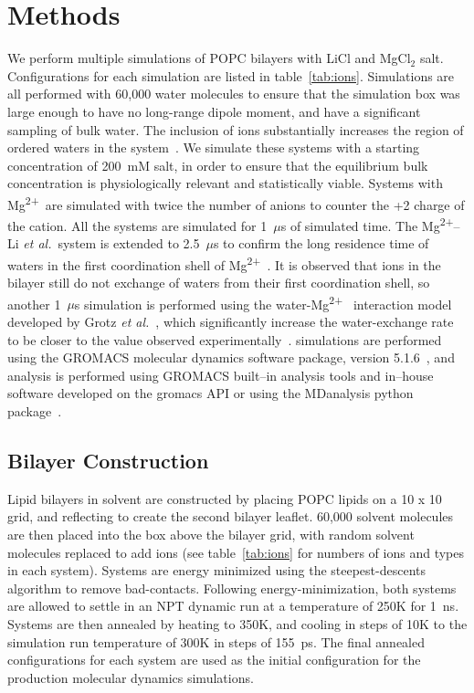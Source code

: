 \documentclass[journal=langd5,manuscript=article]{achemso}
\newcommand{\etal}{\textit{et al.}~}
\newcommand{\mg}{Mg\textsuperscript{2+}~}
\newcommand{\mgmbnbfix}{Mg\textsuperscript{2+}--Li \etal} %
\begin{document}
\section{Methods}
We perform multiple simulations of POPC bilayers
with LiCl and MgCl$_{2}$ salt. Configurations for each simulation are listed in table~\ref{tab:ions}.
Simulations are all performed with 
60,000 water molecules to ensure that the simulation box
was large enough to have no long-range dipole moment, 
and have a significant 
sampling of bulk water. The inclusion of ions substantially increases the region of ordered 
waters in the system~\cite{kruczek:2019,saunders:2022}.
We simulate these systems with a starting concentration of 200~mM salt, in order to ensure
that the equilibrium bulk concentration is physiologically relevant and 
 statistically viable.
Systems with \mg are simulated with twice the number of 
anions to counter the +2 charge of the cation. All the systems are simulated for 1~$\mu$s of simulated time. 
The \mgmbnbfix system is extended to 2.5~$\mu$s to confirm the 
long residence time of waters in the first coordination shell of \mg\cite{grotz:2021:optimized}. 
It is observed that ions in the bilayer still do not
exchange of waters from their first coordination shell, 
so another 1~$\mu$s simulation is performed using the water-\mg 
interaction model developed by Grotz \etal, which significantly increase the water-exchange rate to be closer 
to the value observed experimentally~\cite{grotz:2021:optimized}.
 simulations are performed using the GROMACS molecular dynamics software package, 
version 5.1.6~\cite{abraham:2015,pall:2014,van:2005,lindahl:2001,berendsen:1995}, and analysis is performed using 
GROMACS built--in analysis tools and in--house software developed
on the gromacs API or using the MDanalysis python package~\cite{gromacsmanual,mdanalysis1,mdanalysis2}.
\subsection{Bilayer Construction}
Lipid bilayers in solvent are constructed by placing POPC lipids on a 10 x 10 grid,
and reflecting to create the second bilayer leaflet. 60,000 solvent molecules are then placed 
into the box above the bilayer grid, with random solvent molecules replaced to 
add ions (see table~\ref{tab:ions} for numbers of ions and types in each system).
Systems are energy minimized using the steepest-descents algorithm to remove bad-contacts.
Following energy-minimization, both systems are allowed to settle in an NPT dynamic
run at a temperature of 250K for 1~ns. Systems are then annealed by heating to 350K, and
cooling in steps of 10K to the simulation run temperature of 300K in steps of 
155~ps. The final annealed configurations for each system are used as the initial
configuration for the production molecular dynamics simulations.
\end{document}
